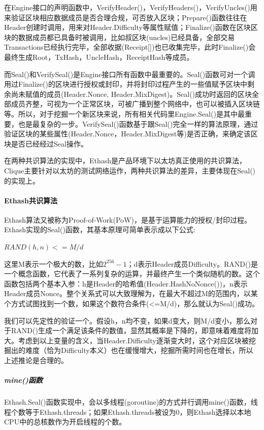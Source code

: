 \documentclass[UTF8]{ctexart}
\begin{document}
在Engine接口的声明函数中，VerifyHeader()，VerifyHeaders()，VerifyUncles()用来验证区块相应数据成员是否合理合规，可否放入区块；Prepare()函数往往在Header创建时调用，用来对Header.Difficulty等属性赋值；Finalize()函数在区块区块的数据成员都已具备时被调用，比如叔区块(uncles)已经具备，全部交易Transactions已经执行完毕，全部收据(Receipt[])也已收集完毕，此时Finalize()会最终生成Root，TxHash，UncleHash，ReceiptHash等成员。

而Seal()和VerifySeal()是Engine接口所有函数中最重要的。Seal()函数可对一个调用过Finalize()的区块进行授权或封印，并将封印过程产生的一些值赋予区块中剩余尚未赋值的成员(Header.Nonce, Header.MixDigest)。Seal()成功时返回的区块全部成员齐整，可视为一个正常区块，可被广播到整个网络中，也可以被插入区块链等。所以，对于挖掘一个新区块来说，所有相关代码里Engine.Seal()是其中最重要，也是最复杂的一步。VerifySeal()函数基于跟Seal()完全一样的算法原理，通过验证区块的某些属性(Header.Nonce，Header.MixDigest等)是否正确，来确定该区块是否已经经过Seal操作。

在两种共识算法的实现中，Ethash是产品环境下以太坊真正使用的共识算法，Clique主要针对以太坊的测试网络运作，两种共识算法的差异，主要体现在Seal()的实现上。

\paragraph{Ethash共识算法}

Ethash算法又被称为Proof-of-Work(PoW)，是基于运算能力的授权/封印过程。Ethash实现的Seal()函数，其基本原理可简单表示成以下公式:

\begin{center}
$RAND(h, n) <= M / d$
\end{center}

这里M表示一个极大的数，比如$2^{256}-1$；d表示Header成员Difficulty。RAND()是一个概念函数，它代表了一系列复杂的运算，并最终产生一个类似随机的数。这个函数包括两个基本入参：h是Header的哈希值(Header.HashNoNonce())，n表示Header成员Nonce。整个关系式可以大致理解为，在最大不超过M的范围内，以某个方式试图找到一个数，如果这个数符合条件(<=M/d)，那么就认为Seal()成功。

我们可以先定性的验证一个。假设h，n均不变，如果d变大，则M/d变小，那么对于RAND()生成一个满足该条件的数值，显然其概率是下降的，即意味着难度将加大。考虑到以上变量的含义，当Header.Difficulty逐渐变大时，这个对应区块被挖掘出的难度（恰为Difficulty本义）也在缓慢增大，挖掘所需时间也在增长，所以上述推论是合理的。

\subparagraph{mine()函数}
Ethash.Seal()函数实现中，会以多线程(goroutine)的方式并行调用mine()函数，线程个数等于Ethash.threads；如果Ethash.threads被设为0，则Ethash选择以本地CPU中的总核数作为开启线程的个数。
\end{document}
